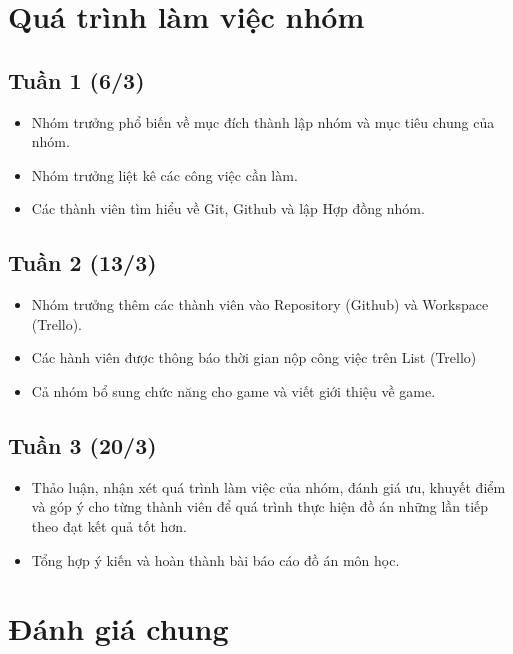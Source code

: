 \documentclass[../main-report.tex]{subfiles}
\begin{document}
\section{Quá trình làm việc nhóm}

\subsection{Tuần 1 (6/3)}

\begin{itemize}

\item Nhóm trưởng phổ biến về mục đích thành lập nhóm và mục tiêu chung của nhóm.
\item Nhóm trưởng liệt kê các công việc cần làm.
\item Các thành viên tìm hiểu về Git, Github và lập Hợp đồng nhóm.

\end{itemize}

\subsection{Tuần 2 (13/3)}

\begin{itemize}

\item Nhóm trưởng thêm các thành viên vào Repository (Github) và Workspace (Trello).
\item Các hành viên được thông báo thời gian nộp công việc trên List (Trello)
\item Cả nhóm bổ sung chức năng cho game và viết giới thiệu về game.

\end{itemize}

\subsection{Tuần 3 (20/3)}

\begin{itemize}

\item Thảo luận, nhận xét quá trình làm việc của nhóm, đánh giá ưu, khuyết điểm và góp ý cho từng thành viên để quá trình thực hiện đồ án những lần tiếp theo đạt kết quả tốt hơn.
\item Tổng hợp ý kiến và hoàn thành bài báo cáo đồ án môn học.
\end{itemize}

\section{Đánh giá chung}
\end{document}
